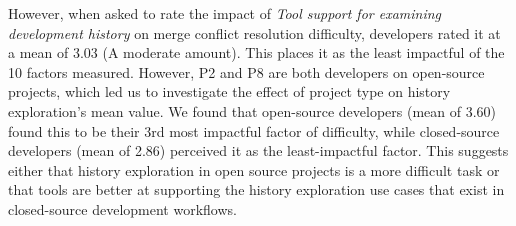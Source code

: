 However, when asked to rate the impact of \textit{Tool support for examining development history} on merge conflict resolution difficulty, developers rated it at a mean of 3.03 (A moderate amount). This places it as the least impactful of the 10 factors measured. However, P2 and P8 are both developers on open-source projects, which led us to investigate the effect of project type on history exploration's mean value. We found that open-source developers (mean of 3.60) found this to be their 3rd most impactful factor of difficulty, while closed-source developers (mean of 2.86) perceived it as the least-impactful factor. This suggests either that history exploration in open source projects is a more difficult task or that tools are better at supporting the history exploration use cases that exist in closed-source development workflows.

